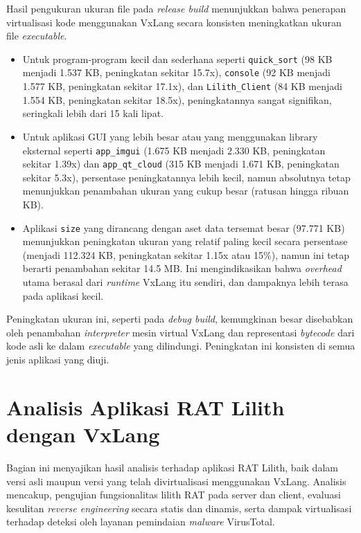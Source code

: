 Hasil pengukuran ukuran file pada \textit{release build} menunjukkan bahwa penerapan virtualisasi kode menggunakan VxLang secara konsisten meningkatkan ukuran file \textit{executable}.
\begin{itemize}
    \item Untuk program-program kecil dan sederhana seperti \texttt{quick\_sort} (98 KB menjadi 1.537 KB, peningkatan sekitar 15.7x), \texttt{console} (92 KB menjadi 1.577 KB, peningkatan sekitar 17.1x), dan \texttt{Lilith\_Client} (84 KB menjadi 1.554 KB, peningkatan sekitar 18.5x), peningkatannya sangat signifikan, seringkali lebih dari 15 kali lipat.
    \item Untuk aplikasi GUI yang lebih besar atau yang menggunakan library eksternal seperti \texttt{app\_imgui} (1.675 KB menjadi 2.330 KB, peningkatan sekitar 1.39x) dan \texttt{app\_qt\_cloud} (315 KB menjadi 1.671 KB, peningkatan sekitar 5.3x), persentase peningkatannya lebih kecil, namun absolutnya tetap menunjukkan penambahan ukuran yang cukup besar (ratusan hingga ribuan KB).
    \item Aplikasi \texttt{size} yang dirancang dengan aset data tersemat besar (97.771 KB) menunjukkan peningkatan ukuran yang relatif paling kecil secara persentase (menjadi 112.324 KB, peningkatan sekitar 1.15x atau 15\%), namun ini tetap berarti penambahan sekitar 14.5 MB. Ini mengindikasikan bahwa \textit{overhead} utama berasal dari \textit{runtime} VxLang itu sendiri, dan dampaknya lebih terasa pada aplikasi kecil.
\end{itemize}
Peningkatan ukuran ini, seperti pada \textit{debug build}, kemungkinan besar disebabkan oleh penambahan \textit{interpreter} mesin virtual VxLang dan representasi \textit{bytecode} dari kode asli ke dalam \textit{executable} yang dilindungi. Peningkatan ini konsisten di semua jenis aplikasi yang diuji.

\section{Analisis Aplikasi RAT Lilith dengan VxLang}
\label{bab:hasil_penelitian_lilith} 
Bagian ini menyajikan hasil analisis terhadap aplikasi RAT Lilith, baik dalam versi asli maupun versi yang telah divirtualisasi menggunakan VxLang. Analisis mencakup, pengujian fungsionalitas lilith RAT pada server dan client, evaluasi kesulitan \textit{reverse engineering} secara statis dan dinamis, serta dampak virtualisasi terhadap deteksi oleh layanan pemindaian \textit{malware} VirusTotal.

